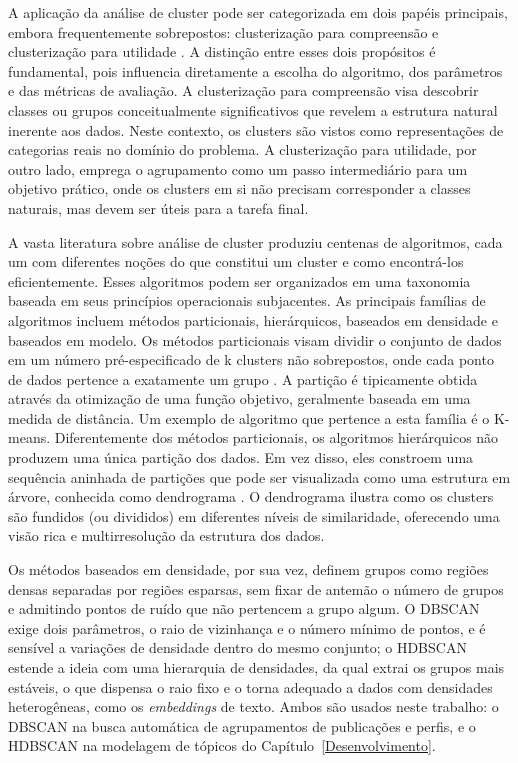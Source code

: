 A aplicação da análise de cluster pode ser categorizada em dois papéis principais, embora frequentemente sobrepostos: clusterização para compreensão e clusterização para utilidade \cite{tan2006}. A distinção entre esses dois propósitos é fundamental, pois influencia diretamente a escolha do algoritmo, dos parâmetros e das métricas de avaliação.
A clusterização para compreensão visa descobrir classes ou grupos conceitualmente significativos que revelem a estrutura natural inerente aos dados. Neste contexto, os clusters são vistos como representações de categorias reais no domínio do problema. A clusterização para utilidade, por outro lado, emprega o agrupamento como um passo intermediário para um objetivo prático, onde os clusters em si não precisam corresponder a classes naturais, mas devem ser úteis para a tarefa final.

A vasta literatura sobre análise de cluster produziu centenas de algoritmos, cada um com diferentes noções do que constitui um cluster e como encontrá-los eficientemente. Esses algoritmos podem ser organizados em uma taxonomia baseada em seus princípios operacionais subjacentes. As principais famílias de algoritmos incluem métodos particionais, hierárquicos, baseados em densidade e baseados em modelo. Os métodos particionais visam dividir o conjunto de dados em um número pré-especificado de k clusters não sobrepostos, onde cada ponto de dados pertence a exatamente um grupo \cite{fahad2014}. A partição é tipicamente obtida através da otimização de uma função objetivo, geralmente baseada em uma medida de distância. Um exemplo de algoritmo que pertence a esta família é o K-means. Diferentemente dos métodos particionais, os algoritmos hierárquicos não produzem uma única partição dos dados. Em vez disso, eles constroem uma sequência aninhada de partições que pode ser visualizada como uma estrutura em árvore, conhecida como dendrograma \cite{henry2005}. O dendrograma ilustra como os clusters são fundidos (ou divididos) em diferentes níveis de similaridade, oferecendo uma visão rica e multirresolução da estrutura dos dados.

Os métodos baseados em densidade, por sua vez, definem grupos como regiões densas separadas por regiões esparsas, sem fixar de antemão o número de grupos e admitindo pontos de ruído que não pertencem a grupo algum. O DBSCAN \cite{ester1996} exige dois parâmetros, o raio de vizinhança e o número mínimo de pontos, e é sensível a variações de densidade dentro do mesmo conjunto; o HDBSCAN \cite{campello2013} estende a ideia com uma hierarquia de densidades, da qual extrai os grupos mais estáveis, o que dispensa o raio fixo e o torna adequado a dados com densidades heterogêneas, como os \emph{embeddings} de texto. Ambos são usados neste trabalho: o DBSCAN na busca automática de agrupamentos de publicações e perfis, e o HDBSCAN na modelagem de tópicos do Capítulo~\ref{Desenvolvimento}.

